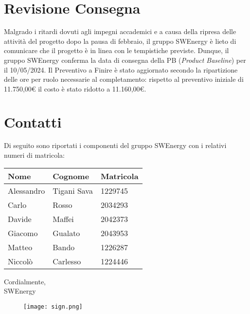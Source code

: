 \section{Revisione Consegna}

Malgrado i ritardi dovuti agli impegni accademici e a causa della ripresa delle
attività del progetto dopo la pausa di febbraio, il gruppo SWEnergy è lieto di
comunicare che il progetto è in linea con le tempistiche previste. Dunque, il
gruppo SWEnergy conferma la data di consegna della PB (\textit{Product Baseline})
per il 10/05/2024.
Il Preventivo a Finire è stato aggiornato secondo la ripartizione
delle ore per ruolo necessarie al completamento: rispetto al preventivo iniziale
di 11.750,00€ il costo è stato ridotto a 11.160,00€.

\section{Contatti}

Di seguito sono riportati i componenti del gruppo SWEnergy con i relativi
numeri di matricola:

\begin{center}
	{
		\renewcommand{\arraystretch}{1.5}
		\begin{tabular}{lll}
			\textbf{Nome} & \textbf{Cognome} & \textbf{Matricola} \\
			\hline
			Alessandro    & Tigani Sava      & 1229745            \\
			Carlo         & Rosso            & 2034293            \\
			Davide        & Maffei           & 2042373            \\
			Giacomo       & Gualato          & 2043953            \\
			Matteo        & Bando            & 1226287            \\
			Niccolò       & Carlesso         & 1224446            \\
			\hline
		\end{tabular}
	}
\end{center}

\vspace{1cm}

\noindent
Cordialmente, \\
SWEnergy

\begin{figure}[H]
	\texttt{[image: sign.png]}
\end{figure}
